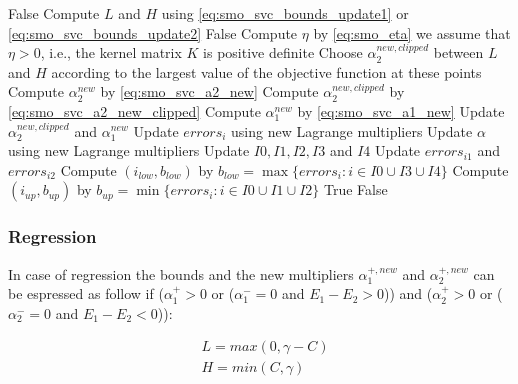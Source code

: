 \begin{breakablealgorithm}
	\newpage
	
	\begin{algorithmic}
				\State \Return False
			\EndIf
			\State Compute $L$ and $H$ using \eqref{eq:smo_svc_bounds_update1} or \eqref{eq:smo_svc_bounds_update2}
				\State \Return False
			\EndIf
			\State Compute $\eta$ by \eqref{eq:smo_eta} \Comment we assume that $\eta > 0$, i.e., the kernel matrix $K$ is positive definite
				\State Choose $\alpha_2^{new,clipped}$ between $L$ and $H$ according to the largest value of the objective function at these points
			\Else
				\State Compute $\alpha_2^{new}$ by \eqref{eq:smo_svc_a2_new}
				\State Compute $\alpha_2^{new,clipped}$ by \eqref{eq:smo_svc_a2_new_clipped}
			\EndIf
				\State Compute $\alpha_1^{new}$ by \eqref{eq:smo_svc_a1_new}
				\State Update $\alpha_2^{new,clipped}$ and $\alpha_1^{new}$
					\State Update $errors_i$ using new Lagrange multipliers
				\EndFor
				\State Update $\alpha$ using new Lagrange multipliers
				\State Update $I0, I1, I2, I3$ and $I4$
				\State Update $errors_{i1}$ and $errors_{i2}$
					\State Compute $(i_{low}, b_{low})$ by $b_{low} = \max\{errors_i : i \in I0 \cup I3 \cup I4\}$
					\State Compute $(i_{up}, b_{up})$ by $b_{up} = \min\{errors_i : i \in I0 \cup I1 \cup I2\}$
				\EndFor
				\State \Return True
			\Else
				\State \Return False
			\EndIf
		\EndFunction
	\end{algorithmic}
\end{breakablealgorithm}

\newpage

\subsubsection{Regression}

In case of regression the bounds and the new multipliers $\alpha_1^{+,new}$ and $\alpha_2^{+,new}$ can be espressed as follow if ($\alpha_1^+ > 0$ or ($\alpha_1^- = 0$ and $ E_1 - E_2 > 0$)) and ($\alpha_2^+ > 0$ or ($\alpha_2^- = 0$ and $ E_1 - E_2 < 0$)):

\begin{equation} \label{eq:smo_svr_bounds_update1}
	\begin{aligned}
		& L = max(0, \gamma - C) \\
		& H = min(C, \gamma)
	\end{aligned}
\end{equation}

